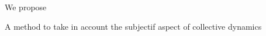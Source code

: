 \documentclass{beamer}
\begin{document}
\begin{frame}{We propose}
{\begin{block}{A method to take in account the subjectif aspect of collective dynamics}
{        \begin{columns}
          \begin{column}{.5\textwidth}

\end{column}
\end{columns}}
\end{block}}
\end{frame}
\end{document}
